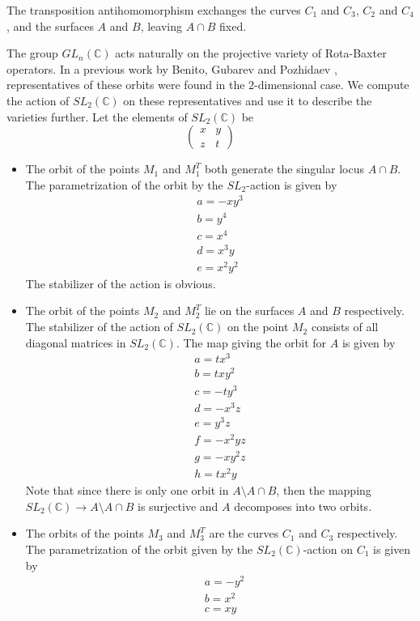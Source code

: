 \documentclass{amsart}
\begin{document}
The transposition antihomomorphism exchanges the curves $C_1$ and $C_3$, $C_2$ and $C_4$, and the surfaces $A$ and $B$, leaving $A \cap B$ fixed.

The group $GL_n(\mathbb{C})$ acts naturally on the projective variety of Rota-Baxter operators. In a previous work by Benito, Gubarev and Pozhidaev \cite{Benito2018}, representatives of these orbits were found in the $2$-dimensional case. We compute the action of $SL_2(\mathbb{C})$ on these representatives and use it to describe the varieties further. Let the elements of $SL_2(\mathbb{C})$ be 
\[\begin{pmatrix}
  x & y\\
  z & t
\end{pmatrix}\]

\begin{itemize}
  \item The orbit of the points $M_1$ and $M_1^T$ both generate the singular locus $A \cap B$. The parametrization of the orbit by the $SL_2$-action is given by
  \begin{align*}
&  a = -x y^{3}\\
  &b = y^{4}\\
  &c = x^{4}\\
  &d = x^{3} y\\
  &e = x^{2} y^{2}
  &\end{align*}
  The stabilizer of the action is obvious.

  \item The orbit of the points $M_2$ and $M_2^T$ lie on the surfaces $A$ and $B$ respectively.
  The stabilizer of the action of $SL_2(\mathbb{C})$ on the point $M_2$ consists of all diagonal matrices in $SL_2(\mathbb{C})$.
  The map giving the orbit for $A$ is given by 
  \begin{align*}
&  a = t x^{3}\\
  &b = t x y^{2}\\
  &c = -t y^{3}\\
  &d = -x^{3} z\\
  &e = y^{3} z\\
  &f = -x^{2} y z\\
  &g = -x y^{2} z\\
  &h = t x^{2} y
  &\end{align*}
  Note that since there is only one orbit in $A \setminus A\cap B$, then the mapping $SL_2(\mathbb{C}) \to A \setminus A \cap B$ is surjective and $A$ decomposes into two orbits.

 \item  The orbits of the points $M_3$ and $M_3^T$ are the curves $C_1$ and $C_3$ respectively. 
  The parametrization of the orbit given by the $SL_2(\mathbb{C})$-action on $C_1$ is given by
  \begin{align*}
  &a = -y^2\\
  &b = x^2\\
  &c = xy
  \end{align*}


\end{itemize}
\end{document}
